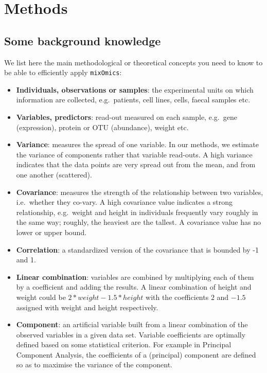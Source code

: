 \documentclass[
]{book}
\begin{document}
\hypertarget{methods}{%
\section{Methods}\label{methods}}

\hypertarget{01:methods}{%
\subsection{Some background knowledge}\label{01:methods}}

We list here the main methodological or theoretical concepts you need to know to be able to efficiently apply \texttt{mixOmics}:

\begin{itemize}
\item
  \textbf{Individuals, observations or samples}: the experimental units on which information are collected, e.g.~patients, cell lines, cells, faecal samples etc.
\item
  \textbf{Variables, predictors}: read-out measured on each sample, e.g.~gene (expression), protein or OTU (abundance), weight etc.
\item
  \textbf{Variance}: measures the spread of one variable. In our methods, we estimate the variance of components rather that variable read-outs. A high variance indicates that the data points are very spread out from the mean, and from one another (scattered).
\item
  \textbf{Covariance}: measures the strength of the relationship between two variables, i.e.~whether they co-vary. A high covariance value indicates a strong relationship, e.g.~weight and height in individuals frequently vary roughly in the same way; roughly, the heaviest are the tallest. A covariance value has no lower or upper bound.
\item
  \textbf{Correlation}: a standardized version of the covariance that is bounded by -1 and 1.
\item
  \textbf{Linear combination}: variables are combined by multiplying each of them by a coefficient and adding the results. A linear combination of height and weight could be \(2 * weight - 1.5 * height\) with the coefficients \(2\) and \(-1.5\) assigned with weight and height respectively.
\item
  \textbf{Component}: an artificial variable built from a linear combination of the observed variables in a given data set. Variable coefficients are optimally defined based on some statistical criterion. For example in Principal Component Analysis, the coefficients of a (principal) component are defined so as to maximise the variance of the component.

\end{itemize}
\end{document}
